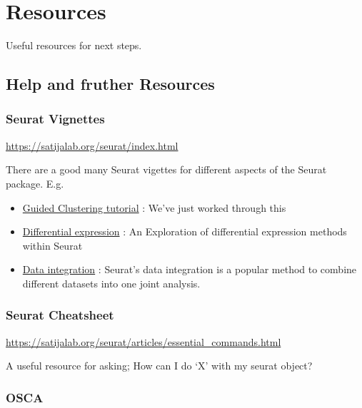 \documentclass[
]{book}
\providecommand{\tightlist}{%
  \setlength{\itemsep}{0pt}\setlength{\parskip}{0pt}}
\begin{document}
\hypertarget{resources}{%
\chapter{Resources}\label{resources}}

Useful resources for next steps.

\hypertarget{help-and-fruther-resources}{%
\section{Help and fruther Resources}\label{help-and-fruther-resources}}

\hypertarget{seurat-vignettes}{%
\subsection*{Seurat Vignettes}\label{seurat-vignettes}}

\url{https://satijalab.org/seurat/index.html}

There are a good many Seurat vigettes for different aspects of the Seurat package. E.g.

\begin{itemize}
\tightlist
\item
  \href{https://satijalab.org/seurat/articles/pbmc3k_tutorial.html}{Guided Clustering tutorial} : We've just worked through this
\item
  \href{https://satijalab.org/seurat/archive/v3.1/de_vignette.html}{Differential expression} : An Exploration of differential expression methods within Seurat
\item
  \href{https://satijalab.org/seurat/articles/integration_introduction.html}{Data integration} : Seurat's data integration is a popular method to combine different datasets into one joint analysis.
\end{itemize}

\hypertarget{seurat-cheatsheet}{%
\subsection*{Seurat Cheatsheet}\label{seurat-cheatsheet}}

\url{https://satijalab.org/seurat/articles/essential_commands.html}

A useful resource for asking; How can I do `X' with my seurat object?

\hypertarget{osca}{%
\subsection*{OSCA}\label{osca}}
\end{document}
